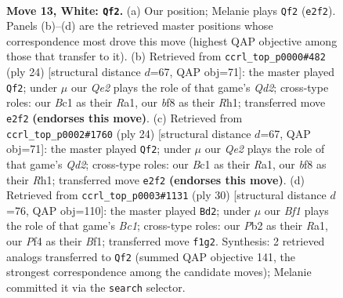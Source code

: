 \documentclass[11pt]{article}
\begin{document}
\clearpage

\begin{figure}[p]\centering
\begin{subfigure}{0.46\textwidth}\centering
\resizebox{\linewidth}{!}{%
\newchessgame
\chessboard[
  setfen={2r1kbnr/pbpp1ppp/4q3/4P3/2p2PPP/2P4R/PP2Q3/RNB1KB2 w Qk - 3 13},
  showmover=false,
  pgfstyle=straightmove, color=movearrow, markmove={e2-f2}
]}
\caption{}
\end{subfigure}\hfill
\begin{subfigure}{0.46\textwidth}\centering
\resizebox{\linewidth}{!}{%
\newchessgame
\chessboard[
  setfen={r3k2r/p2n1p1p/bppp1q1b/8/3PPp1P/2N2B2/PPPQ2P1/R1B1K2R w KQkq - 3 13},
  showmover=false,
  pgfstyle=straightmove, color=movearrow, markmove={d2-f2}
]}
\caption{}
\end{subfigure}
\\[4pt]
\begin{subfigure}{0.46\textwidth}\centering
\resizebox{\linewidth}{!}{%
\newchessgame
\chessboard[
  setfen={r3k2r/p2n1p1p/bppp1q1b/8/3PPp1P/2N2B2/PPPQ2P1/R1B1K2R w KQkq - 3 13},
  showmover=false,
  pgfstyle=straightmove, color=movearrow, markmove={d2-f2}
]}
\caption{}
\end{subfigure}\hfill
\begin{subfigure}{0.46\textwidth}\centering
\resizebox{\linewidth}{!}{%
\newchessgame
\chessboard[
  setfen={r3kb1r/2pp1ppp/b1n1q3/p1p1P2P/2P5/P4NP1/1P2QP2/R1BK1B1R w kq - 1 16},
  showmover=false,
  pgfstyle=straightmove, color=movearrow, markmove={c1-d2}
]}
\caption{}
\end{subfigure}
\caption{\textbf{Move 13, White: \texttt{Qf2}.} (a) Our position; Melanie plays \texttt{Qf2} (\texttt{e2f2}). Panels (b)--(d) are the retrieved master positions whose correspondence most drove this move (highest QAP objective among those that transfer to it). (b) Retrieved from \texttt{ccrl\_top\_p0000\#482} (ply 24) [structural distance $d$=67, QAP obj=71]: the master played \texttt{Qf2}; under $\mu$ our \emph{Qe2} plays the role of that game's \emph{Qd2}; cross-type roles: our \emph{B}c1 as their \emph{R}a1, our \emph{b}f8 as their \emph{R}h1; transferred move \texttt{e2f2} \textbf{(endorses this move)}. (c) Retrieved from \texttt{ccrl\_top\_p0002\#1760} (ply 24) [structural distance $d$=67, QAP obj=71]: the master played \texttt{Qf2}; under $\mu$ our \emph{Qe2} plays the role of that game's \emph{Qd2}; cross-type roles: our \emph{B}c1 as their \emph{R}a1, our \emph{b}f8 as their \emph{R}h1; transferred move \texttt{e2f2} \textbf{(endorses this move)}. (d) Retrieved from \texttt{ccrl\_top\_p0003\#1131} (ply 30) [structural distance $d$=76, QAP obj=110]: the master played \texttt{Bd2}; under $\mu$ our \emph{Bf1} plays the role of that game's \emph{Bc1}; cross-type roles: our \emph{P}b2 as their \emph{R}a1, our \emph{P}f4 as their \emph{B}f1; transferred move \texttt{f1g2}. Synthesis: 2 retrieved analogs transferred to \texttt{Qf2} (summed QAP objective 141, the strongest correspondence among the candidate moves); Melanie committed it via the \texttt{search} selector.}
\label{fig:thought-m24}
\end{figure}
\end{document}
